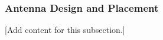 
\subsubsection{Antenna Design and Placement}
\label{subsubsec:design_5_3_antenna_design_placement}

[Add content for this subsection.]
